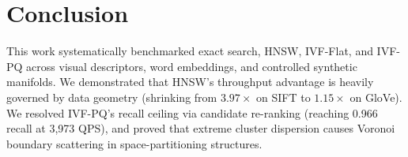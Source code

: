 \documentclass[10pt,twocolumn,a4paper]{article}
\begin{document}
\section{Conclusion}
This work systematically benchmarked exact search, HNSW, IVF-Flat, and IVF-PQ across visual descriptors, word embeddings, and controlled synthetic manifolds. We demonstrated that HNSW's throughput advantage is heavily governed by data geometry (shrinking from $3.97\times$ on SIFT to $1.15\times$ on GloVe). We resolved IVF-PQ's recall ceiling via candidate re-ranking (reaching 0.966 recall at 3,973 QPS), and proved that extreme cluster dispersion causes Voronoi boundary scattering in space-partitioning structures.
\end{document}
